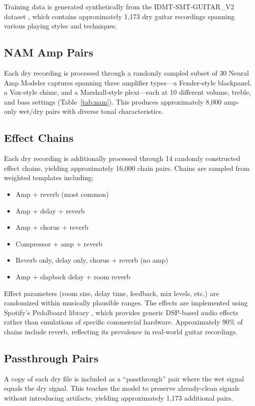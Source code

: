 \documentclass[11pt,twocolumn]{article}
\begin{document}
Training data is generated synthetically from the IDMT-SMT-GUITAR\_V2 dataset \cite{idmt2013}, which contains approximately 1{,}173 dry guitar recordings spanning various playing styles and techniques.

\subsection{NAM Amp Pairs}

Each dry recording is processed through a randomly sampled subset of 30 Neural Amp Modeler captures spanning three amplifier types---a Fender-style blackpanel, a Vox-style chime, and a Marshall-style plexi---each at 10 different volume, treble, and bass settings (Table~\ref{tab:nam}). This produces approximately 8{,}000 amp-only wet/dry pairs with diverse tonal characteristics.

\subsection{Effect Chains}

Each dry recording is additionally processed through 14 randomly constructed effect chains, yielding approximately 16{,}000 chain pairs. Chains are sampled from weighted templates including:
\begin{itemize}
\item Amp + reverb (most common)
\item Amp + delay + reverb
\item Amp + chorus + reverb
\item Compressor + amp + reverb
\item Reverb only, delay only, chorus + reverb (no amp)
\item Amp + slapback delay + room reverb
\end{itemize}
Effect parameters (room size, delay time, feedback, mix levels, etc.) are randomized within musically plausible ranges. The effects are implemented using Spotify's Pedalboard library \cite{pedalboard2021}, which provides generic DSP-based audio effects rather than emulations of specific commercial hardware. Approximately 90\% of chains include reverb, reflecting its prevalence in real-world guitar recordings.

\subsection{Passthrough Pairs}

A copy of each dry file is included as a ``passthrough'' pair where the wet signal equals the dry signal. This teaches the model to preserve already-clean signals without introducing artifacts, yielding approximately 1{,}173 additional pairs.
\end{document}
